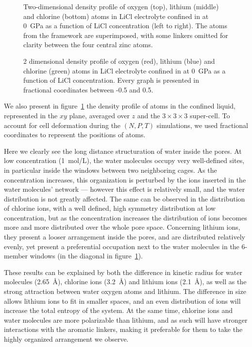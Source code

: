 \documentclass[thesis]{subfiles}
\begin{document}
\begin{figure}[ht]
    \centering
    
    \caption{Two-dimensional density profile of oxygen (top), lithium (middle) and
    chlorine (bottom) atoms in LiCl electrolyte confined in  at \SI{0}{GPa}
    as a function of LiCl concentration (left to right). The atoms from the
     framework are superimposed, with some linkers omitted for clarity
    between the four central zinc atoms.}
    \label{fig:licl-zif:density}
\end{figure}

\begin{figure}[p]
    \centering
    
    \caption{2 dimensional density profile of oxygen (red), lithium (blue) and
    chlorine (green) atoms in LiCl electrolyte confined in  at \SI{0}{GPa}
    as a function of LiCl concentration. Every graph is presented in fractional
    coordinates between -0.5 and 0.5.}
    \label{fig:licl-zif:density:all}
\end{figure}


We also present in figure~\ref{fig:licl-zif:density} the density profile of atoms in the
confined liquid, represented in the $xy$ plane, averaged over $z$ and the
$3\times3\times3$ super-cell. To account for cell deformation during the $(N, P, T)$
simulations, we used fractional coordinates to represent the positions of atoms.

Here we clearly see the long distance structuration of water inside the 
pores. At low concentration (\SI{1}{mol/L}), the water molecules occupy very
well-defined sites, in particular inside the windows between two neighboring
cages. As the concentration increases, this organization is perturbed by the
ions inserted in the water molecules' network --- however this effect is
relatively small, and the water distribution is not greatly affected. The same
can be observed in the distribution of chlorine ions, with a well defined, high
symmetry distribution at low concentration, but as the concentration increases
the distribution of ions becomes more and more distributed over the whole pore
space. Concerning lithium ions, they present a looser arrangement inside the
pores, and are distributed relatively evenly, yet present a preferential
occupation next to the water molecules in the 6-member windows (in the diagonal
in figure~\ref{fig:licl-zif:density}).

These results can be explained by both the difference in kinetic
radius\cite{Marcus1988} for water molecules (\SI{2.65}{\angstrom}), chlorine
ions (\SI{3.2}{\angstrom}) and lithium ions (\SI{2.1}{\angstrom}), as well as
the strong attraction between water oxygen atoms and lithium. The difference in
size allows lithium ions to fit in smaller spaces, and an even distribution of
ions will increase the total entropy of the system. At the same time, chlorine
ions and water molecules are more polarizable than lithium, and as such will
have stronger interactions with the aromatic linkers, making it preferable for
them to take the highly organized arrangement we observe.
\end{document}
